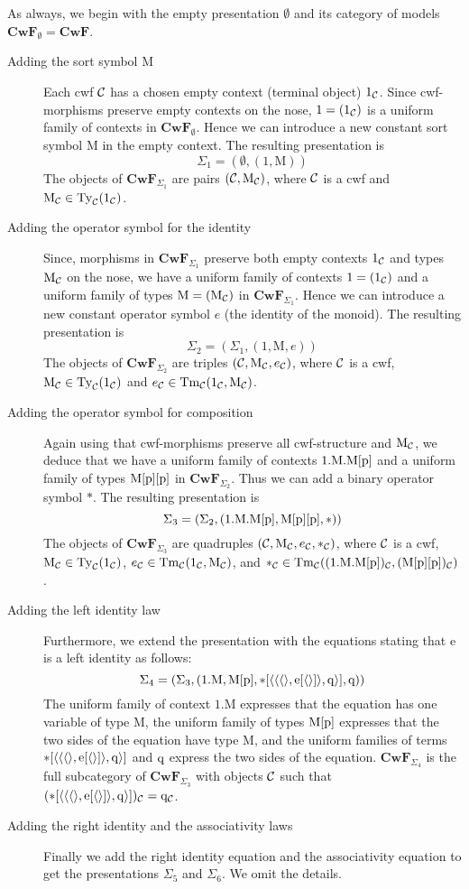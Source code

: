\documentclass{lmcs}
\newcommand{\FYI}[1]{{\color{red}#1}}
\def\Cwf{\mathbf{CwF}}
\def\Mon{\mathrm{M}}
\def\idmon{\mathrm{e}}
\def\comp{\mathrm{*}}
\begin{document}
As always, we begin with the empty \FYI{presentation} $\emptyset$ and its category of models $\Cwf_\emptyset = \Cwf$.
\begin{description}
\item[Adding the sort symbol $\Mon$] Each cwf ${\mathcal C}$ has a chosen empty context (terminal object) $1_{\mathcal C}$. Since cwf-morphisms preserve empty contexts on the nose, $1 = (1_{\mathcal C})$ is a uniform family of contexts in $\Cwf_\emptyset$. Hence we can introduce a new constant sort symbol $\Mon$ in the empty context. The resulting \FYI{presentation} is
$$
\Sigma_1 = (\emptyset, (1,\Mon))
$$
The objects of $\Cwf_{\Sigma_1}$  are pairs $(\C,\Mon_\C)$, where ${\mathcal C}$ is a cwf and $\Mon_\C \in \Ty_\C(1_\C)$.
\item[Adding the operator symbol for the identity]
Since, morphisms in $\Cwf_{\Sigma_1}$ preserve both empty contexts $1_{\mathcal C}$ and types $\Mon_\C$ on the nose, we have a uniform family of contexts $1 = (1_{\mathcal C})$ and a uniform family of types $\Mon = (\Mon_\C)$ in $\Cwf_{\Sigma_1}$. Hence we can introduce a new constant operator symbol $e$ (the identity of the monoid).  The resulting \FYI{presentation} is
$$
\Sigma_2 = (\Sigma_1, (1,\Mon,e))
$$
The objects of $\Cwf_{\Sigma_2}$  are triples $(\C,\Mon_\C,e_\C)$, where ${\mathcal C}$ is a cwf, $\Mon_\C \in \Ty_\C(1_\C)$ and $e_\C \in \Tm_\C(1_\C,\Mon_\C)$.
\item[Adding the operator symbol for composition]
Again using that cwf-morphisms preserve all cwf-structure and $\Mon_\C$, we deduce that we have a uniform family of contexts $1.\Mon.\Mon[\p]$ and a uniform family of types $\Mon[\p][\p]$ in $\Cwf_{\Sigma_2}$. Thus we can add a binary operator symbol $\comp$. The resulting \FYI{presentation} is
$$
\Sigma_3 = (\Sigma_2, (1.\Mon.\Mon[\p],\Mon[\p][\p],\comp))
$$
The objects of $\Cwf_{\Sigma_3}$  are quadruples $(\C,\Mon_\C,e_\C,*_\C)$, where ${\mathcal C}$ is a cwf, $\Mon_\C \in \Ty_\C(1_\C)$, $e_\C \in \Tm_\C(1_\C,\Mon_\C)$, and $*_\C \in \Tm_\C((1.\Mon.\Mon[\p])_\C,(\Mon[\p][\p])_\C)$.
\item[Adding the left identity law]
Furthermore, we extend the \FYI{presentation} with the equations stating that $\idmon$ is a left identity as follows:
$$
\Sigma_4 = (\Sigma_3, (1.\Mon, \Mon[\p], \comp[\tuple{\tuple{\tuple{},\idmon[\tuple{}]},\q}], \q))
$$
The uniform family of context $1.\Mon$ expresses that the equation has one variable of type $\Mon$, the uniform family of types $\Mon[\p]$ expresses that the two sides of the equation have type $\Mon$, and the uniform families of terms $\comp[\tuple{\tuple{\tuple{},\idmon[\tuple{}]},\q}]$ and $\mathrm{q}$ express the two sides of the equation.
$\Cwf_{\Sigma_4}$ is the full subcategory of $\Cwf_{\Sigma_3}$ with objects ${\mathcal C}$
such that $(\comp[\tuple{\tuple{\tuple{},\idmon[\tuple{}]},\q}])_\C = \q_\C$.
\item[Adding the right identity and the associativity laws]
Finally we add the right identity equation and the associativity equation to get the \FYI{presentations} $\Sigma_5$ and $\Sigma_6$. We omit the details.
\end{description}
\end{document}
